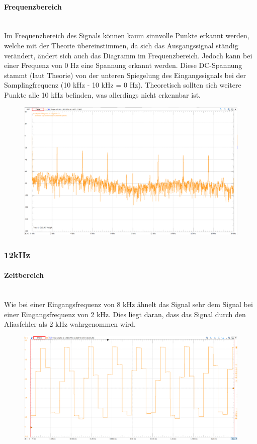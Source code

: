 \documentclass{article}
\begin{document}
\paragraph{Frequenzbereich}\mbox{}\\
Im Frequenzbereich des Signals können kaum sinnvolle Punkte erkannt werden, welche mit der Theorie übereinstimmen, da sich das Ausgangssignal ständig verändert, ändert sich auch das Diagramm im Frequenzbereich. Jedoch kann bei einer Frequenz von 0 Hz eine Spannung erkannt werden. Diese DC-Spannung stammt (laut Theorie) von der unteren Spiegelung des Eingangssignals bei der Samplingfrequenz (10 kHz - 10 kHz = 0 Hz). Theoretisch sollten sich weitere Punkte alle 10 kHz befinden, was allerdings nicht erkennbar ist.
\begin{figure}[h]
    \centering
    \includegraphics[width=0.75\linewidth]{img/Freq_07.png}
\end{figure}

\subsubsection{12kHz}
\paragraph{Zeitbereich}\mbox{}\\
Wie bei einer Eingangsfrequenz von 8 kHz ähnelt das Signal sehr dem Signal bei einer Eingangsfrequenz von 2 kHz. Dies liegt daran, dass das Signal durch den Aliasfehler als 2 kHz wahrgenommen wird.
\begin{figure}[h]
    \centering
    \includegraphics[width=0.8\linewidth]{img/Signal_08.png}
\end{figure}
\end{document}
